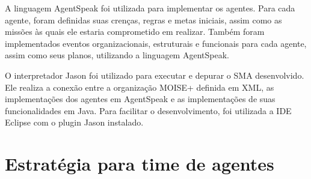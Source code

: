 \documentclass{llncs}
\begin{document}
A linguagem AgentSpeak foi utilizada para implementar os agentes. Para cada agente, foram definidas suas crenças, regras e metas iniciais, assim como as missões às quais ele estaria comprometido em realizar. Também foram implementados eventos organizacionais, estruturais e funcionais para cada agente, assim como seus planos, utilizando a linguagem AgentSpeak.

O interpretador Jason foi utilizado para executar e depurar o SMA desenvolvido. Ele realiza a conexão entre a organização MOISE+ definida em XML, as implementações dos agentes em AgentSpeak e as implementações de suas funcionalidades em Java. Para facilitar o desenvolvimento, foi utilizada a IDE Eclipse com o plugin Jason instalado.


\section{Estratégia para time de agentes}


\end{document}
